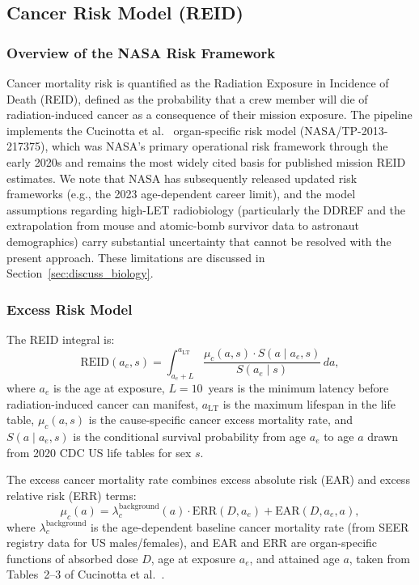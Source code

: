 \subsection{Cancer Risk Model (REID)}
\label{sec:reid}

\subsubsection{Overview of the NASA Risk Framework}
\label{sec:reidoverview}

Cancer mortality risk is quantified as the Radiation Exposure in Incidence of
Death (REID), defined as the probability that a crew member will die of
radiation-induced cancer as a consequence of their mission exposure.
The pipeline implements the Cucinotta et al.\ \cite{cucinotta2013} organ-specific risk model
(NASA/TP-2013-217375), which was NASA's primary operational risk framework
through the early 2020s and remains the most widely cited basis for
published mission REID estimates.
We note that NASA has subsequently released updated risk frameworks
(e.g., the 2023 age-dependent career limit), and the model assumptions
regarding high-LET radiobiology (particularly the DDREF and the
extrapolation from mouse and atomic-bomb survivor data to astronaut
demographics) carry substantial
uncertainty that cannot be resolved with the present approach.
These limitations are discussed in Section~\ref{sec:discuss_biology}.

\subsubsection{Excess Risk Model}
\label{sec:ear}

The REID integral is:
\begin{equation}
  \mathrm{REID}(a_e, s) = \int_{a_e + L}^{a_\mathrm{LT}}
    \frac{\mu_c(a, s) \cdot S(a \mid a_e, s)}{S(a_e \mid s)} \, da,
  \label{eq:reid}
\end{equation}
where $a_e$ is the age at exposure, $L = 10$~years is the minimum latency
before radiation-induced cancer can manifest, $a_\mathrm{LT}$ is the
maximum lifespan in the life table, $\mu_c(a, s)$ is the cause-specific
cancer excess mortality rate, and $S(a \mid a_e, s)$ is the conditional
survival probability from age $a_e$ to age $a$ drawn from 2020 CDC US
life tables for sex $s$.

The excess cancer mortality rate combines excess absolute risk (EAR) and
excess relative risk (ERR) terms:
\begin{equation}
  \mu_c(a) = \lambda_c^\mathrm{background}(a) \cdot \mathrm{ERR}(D, a_e)
           + \mathrm{EAR}(D, a_e, a),
  \label{eq:excess}
\end{equation}
where $\lambda_c^\mathrm{background}$ is the age-dependent baseline cancer
mortality rate (from SEER registry data for US males/females),
and EAR and ERR are organ-specific functions of absorbed dose $D$,
age at exposure $a_e$, and attained age $a$, taken from
Tables~2--3 of Cucinotta et al.\ \cite{cucinotta2013}.

